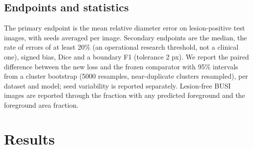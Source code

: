 \documentclass{midl}
\begin{document}
\subsection{Endpoints and statistics}
The primary endpoint is the mean relative diameter error on lesion-positive test images, with seeds averaged per image. Secondary endpoints are the median, the rate of errors of at least 20\% (an operational research threshold, not a clinical one), signed bias, Dice and a boundary F1 (tolerance 2 px). We report the paired difference between the new loss and the frozen comparator with 95\% intervals from a cluster bootstrap \citep{field2007bootstrap} (5000 resamples, near-duplicate clusters resampled), per dataset and model; seed variability is reported separately. Lesion-free BUSI images are reported through the fraction with any predicted foreground and the foreground area fraction.

\section{Results}\label{sec:results}
\end{document}
